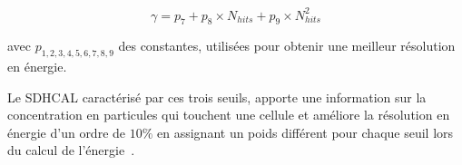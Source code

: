 \begin{equation}
\gamma=p_{7}+p_{8}{\times}N_{hits}+p_{9}{\times}N_{hits}^{2}
\label{equation:5.6}
\end{equation}

avec $p_{1,2,3,4,5,6,7,8,9}$ des constantes, utilis\'ees pour obtenir une meilleur r\'esolution en \'energie. 

\par Le SDHCAL caract\'eris\'e par ces trois seuils, apporte une information sur la concentration en particules qui touchent une cellule et am\'eliore la r\'esolution en \'energie d'un ordre de $10\%$ en assignant un poids diff\'erent pour chaque seuil lors du calcul de l'\'energie~\cite{8}.